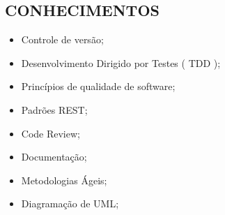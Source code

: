 \begin{framed}
  \section{CONHECIMENTOS}
  \begin{itemize}
    \item Controle de versão;
    \item Desenvolvimento Dirigido por Testes ( TDD );
    \item Princípios de qualidade de software;
    \item Padrões REST;
    \item Code Review;
    \item Documentação;
    \item Metodologias Ágeis;
    \item Diagramação de UML;
  \end{itemize}
\end{framed}